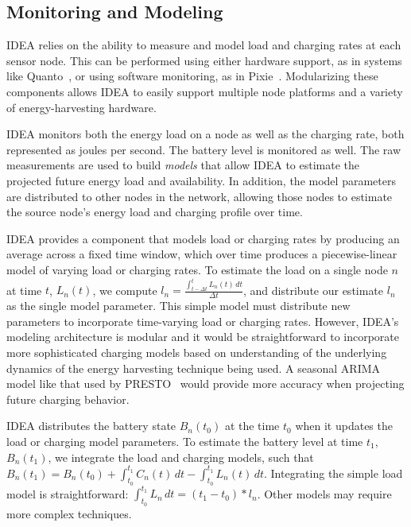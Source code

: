 \subsection{Monitoring and Modeling}

IDEA relies on the ability to measure and model load and charging rates at
each sensor node. This can be performed using either hardware support, as in
systems like Quanto~\cite{quanto-osdi08}, or using software monitoring, as in
Pixie~\cite{pixie-sensys08}. Modularizing these components allows IDEA to
easily support multiple node platforms and a variety of energy-harvesting
hardware.

IDEA monitors both the energy load on a node as well as the charging rate,
both represented as joules per second. The battery level is monitored as
well. The raw measurements are used to build \textit{models} that allow IDEA
to estimate the projected future energy load and availability. In addition,
the model parameters are distributed to other nodes in the network, allowing
those nodes to estimate the source node's energy load and charging profile
over time.

IDEA provides a component that models load or charging rates by producing an
average across a fixed time window, which over time produces a
piecewise-linear model of varying load or charging rates. To estimate the
load on a single node $n$ at time $t$, $L_n(t)$, we compute $l_n =
\frac{\int_{t - \Delta t}^t \! L_n(t)\, dt}{\Delta t}$, and distribute our
estimate $l_n$ as the single model parameter. This simple model must
distribute new parameters to incorporate time-varying load or charging rates.
However, IDEA's modeling architecture is modular and it would be
straightforward to incorporate more sophisticated charging models based on
understanding of the underlying dynamics of the energy harvesting technique
being used. A seasonal ARIMA model like that used by PRESTO~\cite{presto-TON}
would provide more accuracy when projecting future charging behavior.

IDEA distributes the battery state $B_n(t_0)$ at the time $t_0$ when it
updates the load or charging model parameters. To estimate the battery level
at time $t_1$, $B_n(t_1)$, we integrate the load and charging models, such
that $B_n(t_1) = B_n(t_0) + \int_{t_0}^{t_1} \! C_n(t) \, dt -
\int_{t_0}^{t_1} \! L_n(t) \, dt$. Integrating the simple load model is
straightforward: $\int_{t_0}^{t_1} \! L_n \, dt = \left( t_1 - t_0 \right) *
l_n$. Other models may require more complex techniques.

